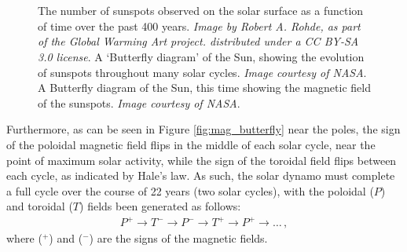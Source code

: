 \documentclass[11pt,a4paper,onecolumn]{report}
\begin{document}
\begin{figure}[t]%
  \centering
  \\%
  \\%
  \caption[]{ The number of sunspots observed on the
  solar surface as a function of time over the past 400 years. \textit{Image by
  Robert A. Rohde, as part of the Global Warming Art project. distributed under
  a CC BY-SA 3.0 license}.  A `Butterfly diagram'
  of the Sun, showing the evolution of sunspots throughout many solar cycles.
  \textit{Image courtesy of NASA}.  A Butterfly
  diagram of the Sun, this time showing the magnetic field of the sunspots.
  \textit{Image courtesy of NASA}. }
\end{figure}

Furthermore, as can be seen in Figure \ref{fig:mag_butterfly} near the poles,
the sign of the poloidal magnetic field flips in the middle of each solar cycle,
near the point of maximum solar activity, while the sign of the toroidal field
flips between each cycle, as indicated by Hale's law. As such, the solar dynamo
must complete a full cycle over the course of 22 years (two solar cycles), with the
poloidal (\(P\)) and toroidal (\(T\)) fields been generated as follows:
\begin{align}
  P^+ \rightarrow T^- \rightarrow P^- \rightarrow T^+ \rightarrow P^+ \rightarrow \dotsc\,,
  \label{eqn:dynamo process}
\end{align}
where (\(^+\)) and (\( ^-\)) are the signs of the magnetic fields. \\
\end{document}
